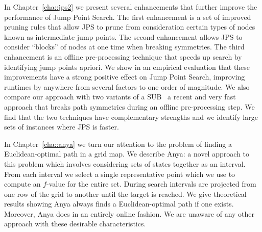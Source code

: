 In Chapter~\ref{cha::jps2} we present several enhancements that further
improve the performance of Jump Point Search. The first enhancement is a set
of improved pruning rules that allow JPS to prune from consideration certain
types of nodes known as intermediate jump points.  The second enhancement
allows JPS to consider ``blocks'' of nodes at one time when breaking
symmetries.  The third enhancement is an offline pre-processing technique that
speeds up search by identifying jump points apriori.  We show in an empirical
evaluation that these improvements have a strong positive effect on Jump Point
Search, improving runtimes by anywhere from several factors to one order of
magnitude. We also compare our approach with two variants of a
SUB~\citep{urasKH13} a recent and very fast approach that breaks path
symmetries during an offline pre-processing step. We find that the two
techniques have complementary strengths and we identify large sets of
instances where JPS is faster.

In Chapter~\ref{cha::anya} we turn our attention to the problem of finding a
Euclidean-optimal path in a grid map. We describe Anya: a novel approach to
this problem which involves considering sets of states together as an
interval. From each interval we select a single representative point which we
use to compute an $f$-value for the entire set.  During search intervals are
projected from one row of the grid to another until the target is reached. We
give theoretical results showing Anya always finds a Euclidean-optimal path if
one exists. Moreover, Anya does in an entirely online fashion. We are unaware
of any other approach with these desirable characteristics.

